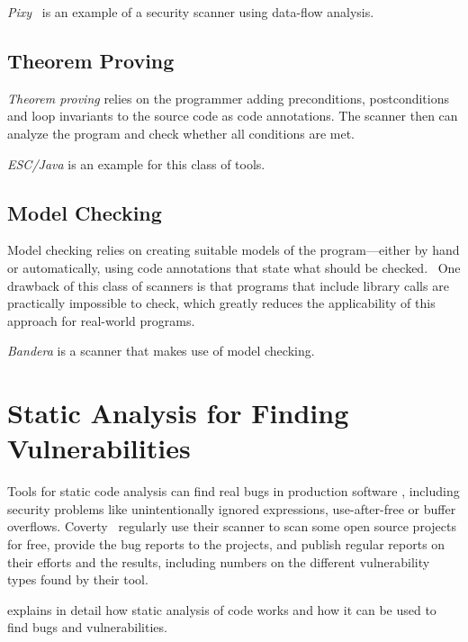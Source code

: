 \emph{Pixy}~\cite{pixy} is an example of a security scanner using data-flow analysis.


\subsection{Theorem Proving}

\emph{Theorem proving} relies on the programmer adding preconditions, postconditions and loop invariants to the source code as code annotations. The scanner then can analyze the program and check whether all conditions are met.~\cite{comparison-of-bug-finding-tools}

\emph{ESC/Java} is an example for this class of tools.


\subsection{Model Checking}

Model checking relies on creating suitable models of the program---either by hand or automatically, using code annotations that state what should be checked.~\cite{data-flow-analysis} One drawback of this class of scanners is that programs that include library calls are practically impossible to check, which greatly reduces the applicability of this approach for real-world programs.~\cite{comparison-of-bug-finding-tools}

\emph{Bandera} is a scanner that makes use of model checking.


\section{Static Analysis for Finding Vulnerabilities}

Tools for static code analysis can find real bugs in production software \cite{findbugs, evaluating}, including security problems like unintentionally ignored expressions, use-after-free or buffer overflows. Coverty~\cite{coverity-report} regularly use their scanner to scan some open source projects for free, provide the bug reports to the projects, and publish regular reports on their efforts and the results, including numbers on the different vulnerability types found by their tool.

\cite{chess-west} explains in detail how static analysis of code works and how it can be used to find bugs and vulnerabilities.



